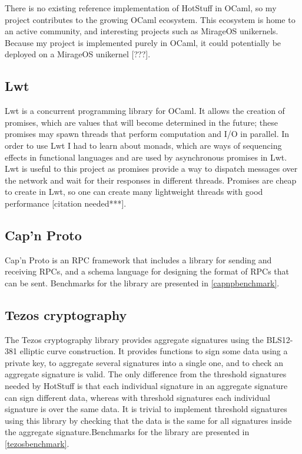 There is no existing reference implementation of HotStuff in OCaml, so my project contributes to the growing OCaml ecosystem. This ecosystem is home to an active community, and interesting projects such as MirageOS unikernels. Because my project is implemented purely in OCaml, it could potentially be deployed on a MirageOS unikernel [???].

\subsection{Lwt}
Lwt is a concurrent programming library for OCaml. It allows the creation of promises, which are values that will become determined in the future; these promises may spawn threads that perform computation and I/O in parallel. In order to use Lwt I had to learn about monads, which are ways of sequencing effects in functional languages and are used by asynchronous promises in Lwt. Lwt is useful to this project as promises provide a way to dispatch messages over the network and wait for their responses in different threads. Promises are cheap to create in Lwt, so one can create many lightweight threads with good performance [citation needed***].

\subsection{Cap'n Proto}
Cap'n Proto is an RPC framework that includes a library for sending and receiving RPCs, and a schema language for designing the format of RPCs that can be sent. Benchmarks for the library are presented in \ref{capnpbenchmark}.

\subsection{Tezos cryptography} \label{tezos}
The Tezos cryptography library provides aggregate signatures using the BLS12-381 elliptic curve construction. It provides functions to sign some data using a private key, to aggregate several signatures into a single one, and to check an aggregate signature is valid. The only difference from the threshold signatures needed by HotStuff is that each individual signature in an aggregate signature can sign different data, whereas with threshold signatures each individual signature is over the same data. It is trivial to implement threshold signatures using this library by checking that the data is the same for all signatures inside the aggregate signature.Benchmarks for the library are presented in \ref{tezosbenchmark}.

